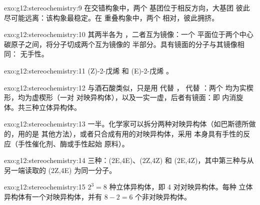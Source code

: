 \begin{solution}{exo:g12:stereochemistry:9}
在交错构象中，两个  基团位于相反方向，大基团
彼此尽可能远离：该构象最稳定。在
重叠构象中，两个  相对，彼此拥挤。
\end{solution}

\begin{solution}{exo:g12:stereochemistry:10}
其两半各为 ，二者互为镜像：一个
平面位于两个中心碳原子之间，将分子切成两个互为镜像的
半部分。具有镜面的分子与其镜像相同：
无手性。
\end{solution}

\begin{solution}{exo:g12:stereochemistry:11}
(Z)-2-戊烯 
和 (E)-2-戊烯 。
\end{solution}

\begin{solution}{exo:g12:stereochemistry:12}
与酒石酸类似，只是用  代替 ，
代替 ：两个  均为实楔形，均为虚楔形（一对
对映异构体），以及一实一虚，后者有镜面：即
内消旋体。共三种立体异构体。
\end{solution}

\begin{solution}{exo:g12:stereochemistry:13}
一半。化学家可以拆分两种对映异构体（如巴斯德所做的，用的是
其他方法），或者只合成有用的对映异构体，采用
本身具有手性的反应（手性催化剂、酶或手性起始
原料）。
\end{solution}

\begin{solution}{exo:g12:stereochemistry:14}
三种：(2E,4E)、(2Z,4Z) 和 (2E,4Z)，其中第三种与从另一端读取的
(2Z,4E) 为同一分子。
\end{solution}

\begin{solution}{exo:g12:stereochemistry:15}
$2^3 = 8$ 种立体异构体，即 4 对对映异构体。每种
立体异构体有一个对映异构体，并有 $8 - 2 = 6$ 个非对映异构体。
\end{solution}

